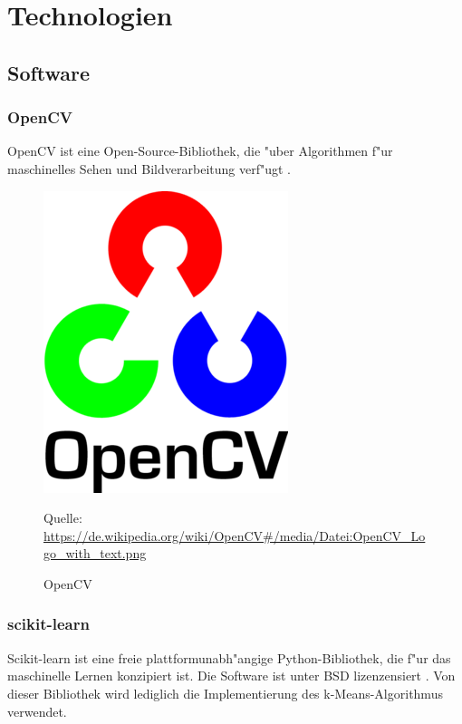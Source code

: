 \chapter{Technologien}
\label{cha:technologien}

\section{Software}
\label{sec:software}

\subsection{OpenCV}
\label{sec:opencv}

OpenCV ist eine Open-Source-Bibliothek, die "uber Algorithmen f"ur maschinelles Sehen und Bildverarbeitung verf"ugt \cite{Ocv}.

\begin{figure}[H]
	\includegraphics[scale=1.0]{bilder/opencv}
	\caption[OpenCV]{OpenCV}
	\small Quelle: \url{https://de.wikipedia.org/wiki/OpenCV#/media/Datei:OpenCV_Logo_with_text.png}
\end{figure}

\subsection{scikit-learn}
\label{sec:scikitlearn}

Scikit-learn ist eine freie plattformunabh"angige Python-Bibliothek, die f"ur das maschinelle Lernen konzipiert ist. Die Software ist unter BSD lizenzensiert \cite{ScL}.
Von dieser Bibliothek wird lediglich die Implementierung des k-Means-Algorithmus verwendet.

